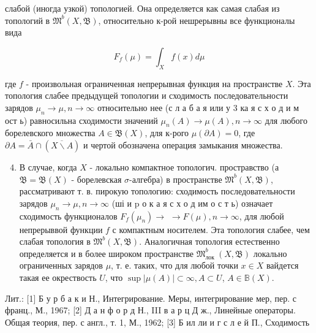 \documentclass[10pt]{article}
\begin{document}
слабой (иногда узкой) топологией. Она определяется как самая слабая из топологий в $\mathfrak{M}^{b}(X, \mathfrak{B})$, относительно к-рой нешрерывны все функционалы вида



\[

F_{f}(\mu)=\int_{X} f(x) d \mu

\]



где $f$ - произвольная ограниченная непрерывная функция на пространстве $X$. Эта топология слабее предыдущей топологии и сходимость последовательности зарядов $\mu_{n} \rightarrow \mu, n \rightarrow \infty$ относительно нее (с л а б а я или у 3 ка я с х о д и м ост ь) равносильна сходимости значений $\mu_{n}(A) \rightarrow \mu(A), n \rightarrow \infty$ для любого борелевского множества $A \in \mathfrak{B}(X)$, для к-рого $\mu(\partial A)=0$, где $\partial A=\bar{A} \cap(\overline{X \backslash A})$ и чертой обозначена операция замыкания множества.



\begin{enumerate}

  \setcounter{enumi}{3}

  \item В случае, когда $X$ - локально компактное топологич. простравство (а $\mathfrak{B}=\mathfrak{B}(X)$ - борелевская $\sigma$-алгебра) в пространстве $\mathfrak{M}^{b}(X, \mathfrak{B})$, рассматривают т. в. пирокую топологию: сходимость последовательности зарядов $\mu_{n} \rightarrow \mu, n \rightarrow \infty$ (ші и $\mathrm{p}$ о к а я с х о д им о с т ь) означает сходимость функционалов $F_{f}\left(\mu_{n}\right) \rightarrow$ $\rightarrow F(\mu), n \rightarrow \infty$, для любой непрерыввой функции $f$ с компактным носителем. Эта топология слабее, чем слабая топология в $\mathfrak{M}^{b}(X, \mathfrak{B})$. Аналогичная топология естественно определяется и в более широком пространстве $\mathfrak{M}_{\text {лок }}^{b}(X, \mathfrak{B})$ локально ограниченных зарядов $\mu$, т. е. таких, что для любой точки $x \in X$ вайдется такая ее окрествость $U$, что $\sup |\mu(A)| \subset \infty, A \subset U$, $A \in \mathbb{B}(X)$.

\end{enumerate}



Лит.: [1] Б у р б а к и Н., Интегрирование. Меры, интегрирование мер, пер. с франц., М., 1967; [2] Д а н ф о р д Н., III в а р ц Д ж., Линейные операторы. Общая теория, пер. с англ., т. 1, М., 1962; [3] Б ил ли и г с л е й П., Сходимость
\end{document}
